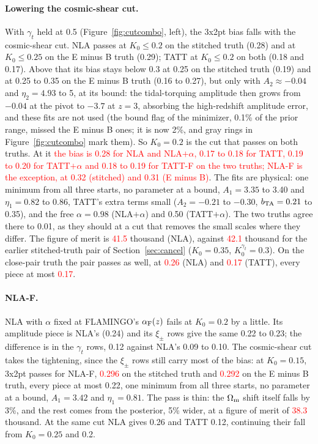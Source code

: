 \documentclass[11pt]{article}
\newcommand{\Om}{\Omega_{\rm m}}
\newif\ifnumbersfinal
\newcommand{\refresh}[1]{\ifnumbersfinal#1\else\textcolor{red}{#1}\fi}
\newcommand{\CPrecNLA}{\refresh{0.26}}
\newcommand{\CPrecTATT}{\refresh{0.17}}
\newcommand{\CPrecBig}{\refresh{0.17}}
\newcommand{\SCfomNLA}{\refresh{41.5}}
\newcommand{\SCfomOld}{\refresh{42.1}}
\newcommand{\SCfinal}{\refresh{the bias is 0.28 for NLA and NLA$+\alpha$, 0.17 to 0.18 for TATT, 0.19 to 0.20 for TATT$+\alpha$ and 0.18 to 0.19 for TATT-F on the two truths; NLA-F is the exception, at 0.32 (stitched) and 0.31 (E minus B)}}
\newcommand{\SCnlafS}{\refresh{0.296}}
\newcommand{\SCnlafEB}{\refresh{0.292}}
\newcommand{\SCfomFifteen}{\refresh{38.3}}
\begin{document}
\paragraph{Lowering the cosmic-shear cut.}
With $\gamma_t$ held at 0.5 (Figure~\ref{fig:cutcombo}, left), the 3x2pt
bias falls with the cosmic-shear cut. NLA passes at $K_0 \le 0.2$ on the
stitched truth (0.28) and at $K_0 \le 0.25$ on the E minus B truth (0.29);
TATT at $K_0 \le 0.2$ on both (0.18 and 0.17). Above that its bias stays below
0.3 at 0.25 on the stitched truth (0.19) and at 0.25 to 0.35 on the E minus B
truth (0.16 to 0.27), but only with $A_2 \approx -0.04$ and $\eta_2 = 4.93$ to
5, at its bound: the tidal-torquing amplitude then grows from $-0.04$ at the
pivot to $-3.7$ at $z = 3$, absorbing the high-redshift amplitude error, and
these fits are not used (the bound flag of the minimizer, 0.1\% of the prior
range, missed the E minus B ones; it is now 2\%, and gray rings in
Figure~\ref{fig:cutcombo} mark them). So $K_0 = 0.2$ is the cut that passes on
both truths. At it \SCfinal. The
fits are physical: one minimum from all three starts, no parameter at a
bound, $A_1 = 3.35$ to 3.40 and $\eta_1 = 0.82$ to 0.86, TATT's extra terms
small ($A_2 = -0.21$ to $-0.30$, $b_{\rm TA} = 0.21$ to 0.35), and the free
$\alpha = 0.98$ (NLA$+\alpha$) and 0.50 (TATT$+\alpha$). The two truths agree there to 0.01, as they should at a cut that
removes the small scales where they differ. The figure of merit is
\SCfomNLA{} thousand (NLA), against \SCfomOld{} thousand for the earlier
stitched-truth pair of Section~\ref{sec:cancel} ($K_0 = 0.35$,
$K_0^{\gamma_t} = 0.3$). On the close-pair truth the pair passes as well,
at \CPrecNLA{} (NLA) and \CPrecTATT{} (TATT), every piece at most
\CPrecBig.

\paragraph{NLA-F.}
NLA with $\alpha$ fixed at FLAMINGO's $\alpha_{\rm F}(z)$ fails at $K_0 =
0.2$ by a little. Its amplitude piece is NLA's (0.24) and its $\xi_\pm$ rows
give the same 0.22 to 0.23; the difference is in the $\gamma_t$ rows, 0.12
against NLA's 0.09 to 0.10. The cosmic-shear cut takes the tightening, since
the $\xi_\pm$ rows still carry most of the bias: at $K_0 = 0.15$, 3x2pt passes
for NLA-F, \SCnlafS{} on the stitched truth and \SCnlafEB{} on the E minus B
truth, every piece at most 0.22, one minimum from all three starts, no
parameter at a bound, $A_1 = 3.42$ and $\eta_1 = 0.81$. The pass is thin: the
$\Om$ shift itself falls by 3\%, and the rest comes from the posterior,
5\% wider, at a figure of merit of \SCfomFifteen{} thousand. At the same cut
NLA gives 0.26 and TATT 0.12, continuing their fall from $K_0 = 0.25$ and
0.2.
\end{document}
